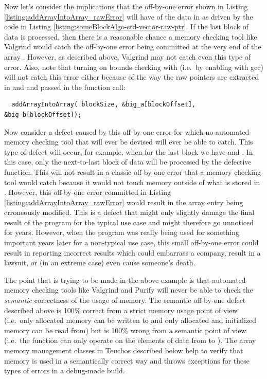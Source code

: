\documentclass[pdf,ps2pdf,11pt]{SANDreport}
\begin{document}
Now let's consider the implications that the off-by-one error shown in
Listing {}\ref{listing:addArrayIntoArray_rawError} will have of the
data in {} as driven by the code in Listing
{}\ref{listing:someBlockAlgo-std-vector-raw-ptr}.  If the last block
{} of data is processed, then there is a
reasonable chance a memory checking tool like Valgrind would catch the
off-by-one error being committed at the very end of the array
{}.  However, as described above, Valgrind may not catch
even this type of error.  Also, note that turning on bounds checking
with {} (i.e.\ by enabling {}
with gcc) will not catch this error either because of the way the raw
pointers are extracted in and and passed in the function call:

{\small\begin{verbatim}
  addArrayIntoArray( blockSize, &big_a[blockOffset], &big_b[blockOffset]);
\end{verbatim}}

Now consider a defect caused by this off-by-one error for which no
automated memory checking tool that will ever be devised will ever be
able to catch.  This type of defect will occur, for example, when for
the last block {} we have
{} and
{}.  In this case, only
the next-to-last block of data will be processed by the defective
{} function.  This will not result in a
classic off-by-one error that a memory checking tool would catch
because it would not touch memory outside of what is stored in
{}.  However, this off-by-one error committed in Listing
{}\ref{listing:addArrayIntoArray_rawError} would result in the array
entry {} being
erroneously modified.  This is a defect that might only slightly
damage the final result of the program for the typical use case and
might therefore go unnoticed for years.  However, when the program was
really being used for something important years later for a
non-typical use case, this small off-by-one error could result in
reporting incorrect results which could embarrass a company, result in
a lawsuit, or (in an extreme case) even cause someone's death.

The point that is trying to be made in the above example is that
automated memory checking tools like Valgrind and Purify will never be
able to check the {}\textit{semantic} correctness of the usage of
memory.  The semantic off-by-one defect described above is 100\%
correct from a strict memory usage point of view (i.e.\ only allocated
memory can be written to and only allocated and initialized memory can
be read from) but is 100\% wrong from a semantic point of view (i.e.\
the function {} can only operate on the
elements of data from {}\ttt{0} to {}\ttt{n-1}).  The array memory
management classes in Teuchos described below help to verify that
memory is used in a semantically correct way and throws exceptions for
these types of errors in a debug-mode build.
\end{document}
